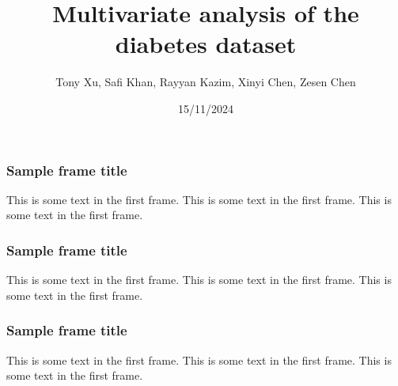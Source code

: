 \documentclass{beamer}
\title{Multivariate analysis of the diabetes dataset}
\author{Tony Xu, Safi Khan, Rayyan Kazim, Xinyi Chen, Zesen Chen}
\institute{McMaster University}
\date{15/11/2024}
\begin{document}
\frame{\titlepage}

\begin{frame}
\frametitle{Sample frame title}
This is some text in the first frame. This is some text in the first frame. This is some text in the first frame.
\end{frame}

\begin{frame}
    \frametitle{Sample frame title}
    This is some text in the first frame. This is some text in the first frame. This is some text in the first frame.
\end{frame}

\begin{frame}
    \frametitle{Sample frame title}
        This is some text in the first frame. This is some text in the first frame. This is some text in the first frame.
\end{frame}
\end{document}
